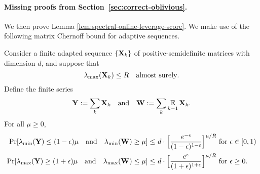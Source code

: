 \paragraph{Missing proofs from Section~\ref{sec:correct-oblivious}.}
We then prove Lemma \ref{lem:spectral-online-leverage-score}. We make use of the following matrix Chernoff bound for adaptive sequences.
\begin{lemma}
\label{lem:matrix-adaptive}
Consider a finite adapted sequence $\{\mathbf{X}_k\}$ of positive-semidefinite matrices with dimension $d$, and suppose that
\[
\lambda_{\max}(\mathbf{X}_k) \leq R \quad \text{almost surely}.
\]
Define the finite series 
\[
\mathbf{Y} := \sum_{k}\mathbf{X}_k \quad \text{and}  \quad \mathbf{W}:= \sum_{k}\operatorname*{{\mathbb{E}}}_{k-1} \mathbf{X}_k.
\]
For all $\mu \geq 0$, 
\begin{align*}
\Pr[\lambda_{\min}(\mathbf{Y}) \leq (1-\epsilon)\mu \quad\text{and}\quad \lambda_{\min}(\mathbf{W}) \geq \mu] \leq &~ d\cdot \Big[\frac{e^{-\epsilon}}{(1-\epsilon)^{1-\epsilon}}\Big]^{\mu/R} \text{ for } \epsilon \in [0, 1)\\
\Pr[\lambda_{\max}(\mathbf{Y}) \geq (1+\epsilon)\mu \quad\text{and}\quad \lambda_{\max}(\mathbf{W}) \leq \mu] \leq &~ d\cdot \Big[\frac{e^{\epsilon}}{(1+\epsilon)^{1+\epsilon}}\Big]^{\mu/R} \text{ for } \epsilon \geq 0.
\end{align*}
\end{lemma}


